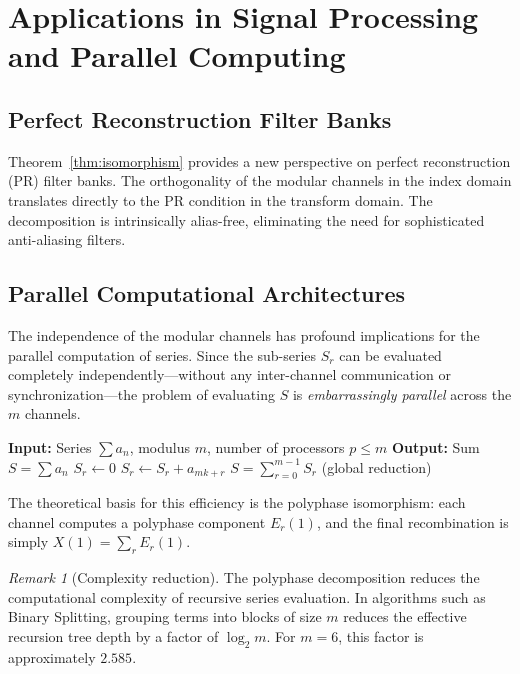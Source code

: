 \documentclass{mcom-l} %
\theoremstyle{plain} %
\theoremstyle{definition} %
\theoremstyle{remark} %
\newtheorem{remark}[theorem]{Remark}
\begin{document}
\section{Applications in Signal Processing and Parallel Computing}
\label{sec:DSP}

\subsection{Perfect Reconstruction Filter Banks}
Theorem~\ref{thm:isomorphism} provides a new perspective on perfect reconstruction (PR) filter banks. The orthogonality of the modular channels in the index domain translates directly to the PR condition in the transform domain. The decomposition is intrinsically alias-free, eliminating the need for sophisticated anti-aliasing filters.

\subsection{Parallel Computational Architectures}
The independence of the modular channels has profound implications for the parallel computation of series. Since the sub-series \(S_r\) can be evaluated completely independently---without any inter-channel communication or synchronization---the problem of evaluating \(S\) is \emph{embarrassingly parallel} across the \(m\) channels.

\begin{algorithm}[H]
\caption{Shared-Nothing Parallel Series Evaluation}
\label{alg:parallel}
\begin{algorithmic}[1]
\State \textbf{Input:} Series \(\sum a_n\), modulus \(m\), number of processors \(p \le m\)
\State \textbf{Output:} Sum \(S = \sum a_n\)
    \State \(S_r \gets 0\)
        \State \(S_r \gets S_r + a_{mk + r}\)
    \EndFor
\EndFor
\State \Return \(S = \sum_{r=0}^{m-1} S_r\) (global reduction)
\end{algorithmic}
\end{algorithm}

The theoretical basis for this efficiency is the polyphase isomorphism: each channel computes a polyphase component \(E_r(1)\), and the final recombination is simply \(X(1) = \sum_r E_r(1)\).

\begin{remark}[Complexity reduction]
The polyphase decomposition reduces the computational complexity of recursive series evaluation. In algorithms such as Binary Splitting, grouping terms into blocks of size \(m\) reduces the effective recursion tree depth by a factor of \(\log_2 m\). For \(m=6\), this factor is approximately \(2.585\).
\end{remark}
\end{document}
